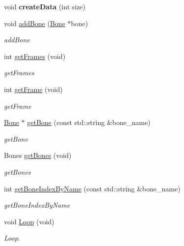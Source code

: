 \begin{DoxyCompactItemize}
\item 
\hypertarget{classEngine_1_1Animation_a2d915137bb1f8632baa2397b17f517b1}{}void {\bfseries create\+Data} (int size)\label{classEngine_1_1Animation_a2d915137bb1f8632baa2397b17f517b1}

\item 
void \hyperlink{classEngine_1_1Animation_a2678bd4ba646733c450eddea86580b2a}{add\+Bone} (\hyperlink{classEngine_1_1Bone}{Bone} $\ast$bone)
\begin{DoxyCompactList}\small\item\em add\+Bone \end{DoxyCompactList}\item 
int \hyperlink{classEngine_1_1Animation_ac07bf343bc9d9d4affaf521c7a45412e}{get\+Frames} (void)
\begin{DoxyCompactList}\small\item\em get\+Frames \end{DoxyCompactList}\item 
int \hyperlink{classEngine_1_1Animation_abc9b8ad81c5a08dd3248ad9e1126e51a}{get\+Frame} (void)
\begin{DoxyCompactList}\small\item\em get\+Frame \end{DoxyCompactList}\item 
\hyperlink{classEngine_1_1Bone}{Bone} $\ast$ \hyperlink{classEngine_1_1Animation_a733bedc14108ae1ba9b8334459e7e116}{get\+Bone} (const std\+::string \&bone\+\_\+name)
\begin{DoxyCompactList}\small\item\em get\+Bone \end{DoxyCompactList}\item 
Bones \hyperlink{classEngine_1_1Animation_a9976158328cae7a6b48cccee07dece5c}{get\+Bones} (void)
\begin{DoxyCompactList}\small\item\em get\+Bones \end{DoxyCompactList}\item 
int \hyperlink{classEngine_1_1Animation_aefee6093f48f082d0ab7a318a4ebb48f}{get\+Bone\+Index\+By\+Name} (const std\+::string \&bone\+\_\+name)
\begin{DoxyCompactList}\small\item\em get\+Bone\+Index\+By\+Name \end{DoxyCompactList}\item 
void \hyperlink{classEngine_1_1Animation_aecf4dcf209d4b66e9f53585c920b19cb}{Loop} (void)
\begin{DoxyCompactList}\small\item\em Loop. \end{DoxyCompactList}\item 

\end{DoxyCompactItemize}
